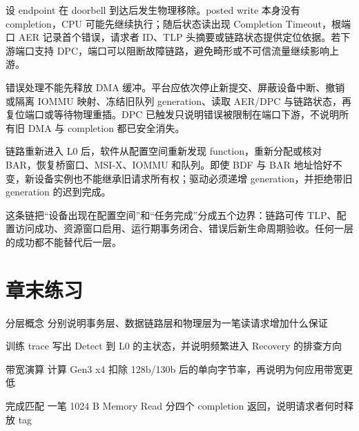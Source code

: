 
设 endpoint 在 doorbell 到达后发生物理移除。posted write 本身没有 completion，CPU 可能先继续执行；随后状态读出现 Completion Timeout，根端口 AER 记录首个错误，请求者 ID、TLP 头摘要或链路状态提供定位依据。若下游端口支持 DPC，端口可以阻断故障链路，避免畸形或不可信流量继续影响上游。

错误处理不能先释放 DMA 缓冲。平台应依次停止新提交、屏蔽设备中断、撤销或隔离 IOMMU 映射、冻结旧队列 generation、读取 AER/DPC 与链路状态，再复位端口或等待物理重插。DPC 已触发只说明错误被限制在端口下游，不说明所有旧 DMA 与 completion 都已安全消失。


链路重新进入 L0 后，软件从配置空间重新发现 function，重新分配或核对 BAR，恢复桥窗口、MSI-X、IOMMU 和队列。即使 BDF 与 BAR 地址恰好不变，新设备实例也不能继承旧请求所有权；驱动必须递增 generation，并拒绝带旧 generation 的迟到完成。

这条链把“设备出现在配置空间”和“任务完成”分成五个边界：链路可传 TLP、配置访问成功、资源窗口启用、运行期事务闭合、错误后新生命周期验收。任何一层的成功都不能替代后一层。

\section*{章末练习}

\begin{chapterexercise}{分层概念}
分别说明事务层、数据链路层和物理层为一笔读请求增加什么保证
\end{chapterexercise}

\begin{chapterexercise}{训练 trace}
写出 Detect 到 L0 的主状态，并说明频繁进入 Recovery 的排查方向
\end{chapterexercise}

\begin{chapterexercise}{带宽演算}
计算 Gen3 x4 扣除 128b/130b 后的单向字节率，再说明为何应用带宽更低
\end{chapterexercise}

\begin{chapterexercise}{完成匹配}
一笔 1024 B Memory Read 分四个 completion 返回，说明请求者何时释放 tag
\end{chapterexercise}

